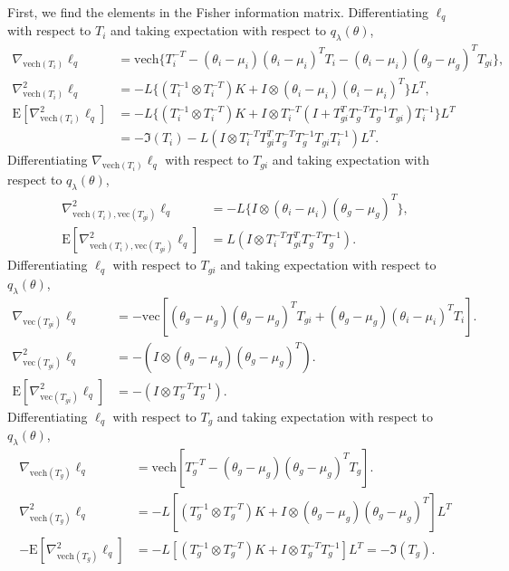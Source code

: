 \documentclass{statsoc}
\newcommand\E{{\text{E}}}
\newcommand{\vc}{\text{vec}}
\newcommand{\vech}{\text{vech}}
\begin{document}
First, we find the elements in the Fisher information matrix. Differentiating $\ell_q$ with respect to $T_i$ and taking expectation with respect to $q_\lambda (\theta)$, 
\[
\begin{aligned}
\nabla_{\vech(T_i)} \ell_q &= \vech\{T_i^{-T} - (\theta_i - \mu_i) (\theta_i - \mu_i)^T T_i - (\theta_i - \mu_i)(\theta_g - \mu_g)^T T_{gi} \}, \\
\nabla_{\vech(T_i)}^2 \ell_q &= - L \{ (T_i^{-1} \otimes T_i^{-T})K +  I \otimes (\theta_i - \mu_i)  (\theta_i - \mu_i)^T \}L^T, \\
\E[\nabla_{\vech(T_i)}^2 \ell_q] &= -L \{  (T_i^{-1} \otimes T_i^{-T})K + I \otimes T_i^{-T} (I + T_{gi}^T T_g^{-T} T_g^{-1} T_{gi}) T_i^{-1} \}L^T \\
&= - \mathfrak{I}(T_i) -  L ( I \otimes T_i^{-T} T_{gi}^T T_g^{-T} T_g^{-1} T_{gi} T_i^{-1} ) L^T.
\end{aligned}
\]
Differentiating $\nabla_{\vech(T_i)} \ell_q$ with respect to $T_{gi}$ and taking expectation with respect to $q_\lambda (\theta)$, 
\[
\begin{aligned}
\nabla_{\vech(T_i), \vc(T_{gi})}^2 \ell_q &= - L \{I \otimes (\theta_i - \mu_i)(\theta_g - \mu_g)^T  \}, \\
\E [\nabla_{\vech(T_i), \vc(T_{gi})}^2 \ell_q]&= L (I \otimes T_i^{-T} T_{gi}^T T_g^{-T} T_g^{-1} ).
\end{aligned}
\]
Differentiating $\ell_q$ with respect to $T_{gi}$ and taking expectation with respect to $q_\lambda (\theta)$, 
\[
\begin{aligned}
\nabla_{\vc(T_{gi})} \ell_q &= - \vc[ (\theta_g - \mu_g)(\theta_g - \mu_g)^T  T_{gi} + (\theta_g - \mu_g)(\theta_i - \mu_i)^T T_i]. \\
\nabla_{\vc(T_{gi})}^2 \ell_q &= - (I \otimes  (\theta_g - \mu_g)(\theta_g - \mu_g)^T ) . \\
\E[\nabla_{\vc(T_{gi})}^2 \ell_q] &= - (I \otimes T_g^{-T}T_g^{-1}).
\end{aligned}
\]
Differentiating $\ell_q$ with respect to $T_g$ and taking expectation with respect to $q_\lambda (\theta)$, 
\begin{align*}
\nabla_{\vech (T_g)} \ell_q &= \vech[ T_g^{-T} - (\theta_g - \mu_g)(\theta_g - \mu_g)^T T_g]. \\
\nabla_{\vech (T_g)}^2  \ell_q &= - L [ (T_g^{-1} \otimes T_g^{-T})K + I \otimes (\theta_g - \mu_g)(\theta_g - \mu_g)^T ]  L^T \\
-\E[\nabla_{\vech (T_g)}^2  \ell_q ]&= - L [ (T_g^{-1} \otimes T_g^{-T})K + I \otimes T_g^{-T} T_g^{-1} ]  L^T = - \mathfrak{I}(T_g).
\end{align*}
\end{document}
